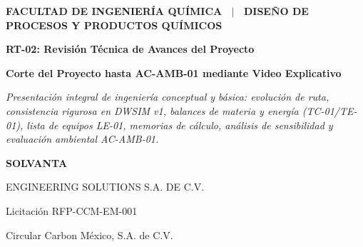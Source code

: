 \documentclass[10pt,landscape]{article}
\begin{document}
\thispagestyle{empty}
\begin{tcolorbox}[
  enhanced,
  colback=white,
  colframe=navyblue,
  arc=3mm,
  boxrule=1.5pt,
  width=\textwidth,
  height=0.96\textheight,
  top=8pt,
  bottom=8pt,
  left=14pt,
  right=14pt
]
  \begin{minipage}[c]{0.65\textwidth}
    {\fontsize{8pt}{10pt}\selectfont \textbf{\color{accentcyan}FACULTAD DE INGENIERÍA QUÍMICA \ $|$ \ DISEÑO DE PROCESOS Y PRODUCTOS QUÍMICOS}}\par
    \vspace{2pt}
    {\fontsize{18pt}{22pt}\selectfont \textbf{\color{navyblue}RT-02: Revisión Técnica de Avances del Proyecto}}\par
    \vspace{2pt}
    {\fontsize{11pt}{13.5pt}\selectfont \textbf{\color{accentcyan}Corte del Proyecto hasta AC-AMB-01 mediante Video Explicativo}}\par
    \vspace{3pt}
    {\fontsize{8pt}{10pt}\selectfont \textit{Presentación integral de ingeniería conceptual y básica: evolución de ruta, consistencia rigurosa en DWSIM v1, balances de materia y energía (TC-01/TE-01), lista de equipos LE-01, memorias de cálculo, análisis de sensibilidad y evaluación ambiental AC-AMB-01.}}
  \end{minipage}
  \hfill
  \begin{minipage}[c]{0.32\textwidth}
    \begin{tcolorbox}[colback=navyblue,colframe=navyblue,arc=2mm,top=6pt,bottom=6pt,left=8pt,right=8pt]
      \centering
      {\color{white}\fontsize{11pt}{13pt}\selectfont \textbf{SOLVANTA}}\par
      \vspace{1pt}
      {\color{accentcyan}\fontsize{7.5pt}{9pt}\selectfont ENGINEERING SOLUTIONS S.A. DE C.V.}\par
      \vspace{3pt}
      {\color{white!90}\fontsize{6.5pt}{8pt}\selectfont Licitación RFP-CCM-EM-001}\par
      {\color{white!70}\fontsize{6pt}{7.5pt}\selectfont Circular Carbon México, S.A. de C.V.}
    \end{tcolorbox}
  \end{minipage}


\end{tcolorbox}
\end{document}
